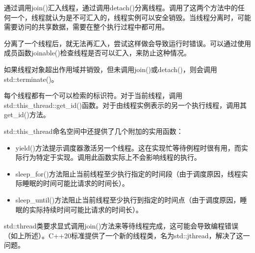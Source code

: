 通过调用join()汇入线程，通过调用detach()分离线程。调用了这两个方法中的任何一个，线程就认为是不可汇入的，线程实例可以安全销毁。当线程分离时，可能需要访问的共享数据，需要在整个执行过程中都可用。

分离了一个线程后，就无法再汇入，尝试这样做会导致运行时错误。可以通过使用成员函数joinable()检查线程是否可以汇入，来防止这种情况。

如果线程对象超出作用域并销毁，但未调用join()或detach()，则会调用std::terminate()。

每个线程都有一个可以检索的标识符。对于当前线程，调用std::this\_thread::get\_id()函数。对于由线程实例表示的另一个执行线程，调用其get\_id()方法。

std::this\_thread命名空间中还提供了几个附加的实用函数：

\begin{itemize}
\item
yield()方法提示调度器激活另一个线程。这在实现忙等待例程时很有用，而实际行为特定于实现。调用此函数实际上不会影响线程的执行。

\item
sleep\_for()方法阻止当前线程至少执行指定的时间段（由于调度原因，线程实际睡眠的时间可能比请求的时间长）。

\item
sleep\_until()方法阻止当前线程至少执行到指定的时间点（由于调度原因，睡眠的实际持续时间可能比请求的时间长）。
\end{itemize}

std::thread类要求显式调用join()方法来等待线程完成，这可能会导致编程错误（如上所述）。C++20标准提供了一个新的线程类，名为std::jthread，解决了这一问题。











